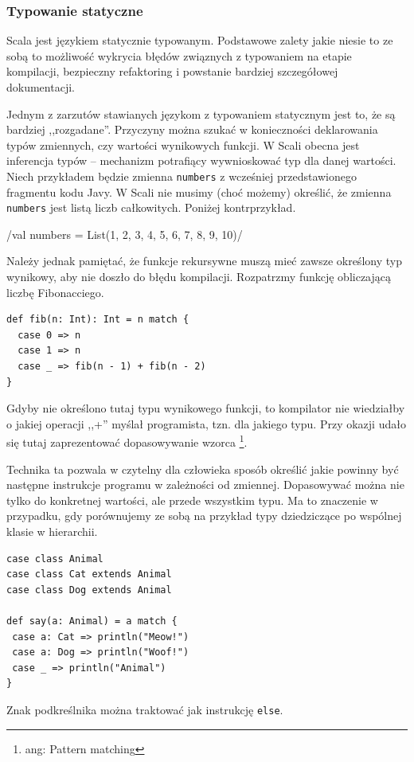 \documentclass[brudnopis]{xmgr}
\begin{document}
\subsubsection{Typowanie statyczne}

Scala jest językiem statycznie typowanym. Podstawowe zalety jakie niesie to ze sobą to możliwość wykrycia błędów związnych z typowaniem na etapie kompilacji, bezpieczny refaktoring i powstanie bardziej szczegółowej dokumentacji. 

Jednym z zarzutów stawianych językom z typowaniem statycznym jest to, że są bardziej ,,rozgadane''. Przyczyny można szukać w konieczności deklarowania typów zmiennych, czy wartości wynikowych funkcji. W Scali obecna jest inferencja typów -- mechanizm potrafiący wywnioskować typ dla danej wartości. Niech przykładem będzie zmienna \texttt{numbers} z wcześniej przedstawionego fragmentu kodu Javy. W Scali nie musimy (choć możemy) określić, że zmienna \texttt{numbers} jest listą liczb całkowitych. Poniżej kontrprzykład.

/val numbers = List(1, 2, 3, 4, 5, 6, 7, 8, 9, 10)/

Należy jednak pamiętać, że funkcje rekursywne muszą mieć zawsze określony typ wynikowy, aby nie doszło do błędu kompilacji. Rozpatrzmy funkcję obliczającą liczbę Fibonacciego.

\begin{verbatim}
def fib(n: Int): Int = n match {
  case 0 => n
  case 1 => n
  case _ => fib(n - 1) + fib(n - 2)
}
\end{verbatim}

Gdyby nie określono tutaj typu wynikowego funkcji, to kompilator nie wiedziałby o jakiej operacji ,,+'' myślał programista, tzn. dla jakiego typu. Przy okazji udało się tutaj zaprezentować dopasowywanie wzorca \footnote{ang: Pattern matching}.

Technika ta pozwala w czytelny dla człowieka sposób określić jakie powinny być następne instrukcje programu w zależności od zmiennej. Dopasowywać można nie tylko do konkretnej wartości, ale przede wszystkim typu. Ma to znaczenie w przypadku, gdy porównujemy ze sobą na przykład typy dziedziczące po wspólnej klasie w hierarchii.

\begin{verbatim}
case class Animal
case class Cat extends Animal
case class Dog extends Animal

def say(a: Animal) = a match {
 case a: Cat => println("Meow!")
 case a: Dog => println("Woof!")
 case _ => println("Animal")
}
\end{verbatim}
\label{patternMatching:example}
Znak podkreślnika można traktować jak instrukcję \texttt{else}.
\end{document}

